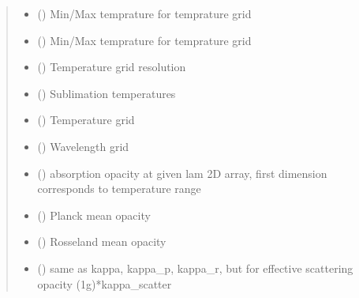 \documentclass[a4paper,11pt,english]{sphinxmanual}
\begin{document}
\begin{fulllineitems}
\begin{quote}
\begin{description}
\begin{itemize}
\item {} 
\sphinxAtStartPar
{} () \textendash{} Min/Max temprature for temprature grid

\item {} 
\sphinxAtStartPar
{} () \textendash{} Min/Max temprature for temprature grid

\item {} 
\sphinxAtStartPar
{} () \textendash{} Temperature grid resolution

\end{itemize}

\sphinxAtStartPar
\begin{itemize}
\item {} 
\sphinxAtStartPar
{} () \textendash{} Sublimation temperatures

\item {} 
\sphinxAtStartPar
{} () \textendash{} Temperature grid

\item {} 
\sphinxAtStartPar
{} () \textendash{} Wavelength grid

\item {} 
\sphinxAtStartPar
{} () \textendash{} absorption opacity at given lam
2D array, first dimension corresponds to temperature range

\item {} 
\sphinxAtStartPar
{} () \textendash{} Planck mean opacity

\item {} 
\sphinxAtStartPar
{} () \textendash{} Rosseland mean opacity

\item {} 
\sphinxAtStartPar
{} () \textendash{} same as kappa, kappa\_p, kappa\_r, but for effective scattering opacity
(1\sphinxhyphen{}g)*kappa\_scatter

\end{itemize}


\end{description}\end{quote}

\end{fulllineitems}
\end{document}
